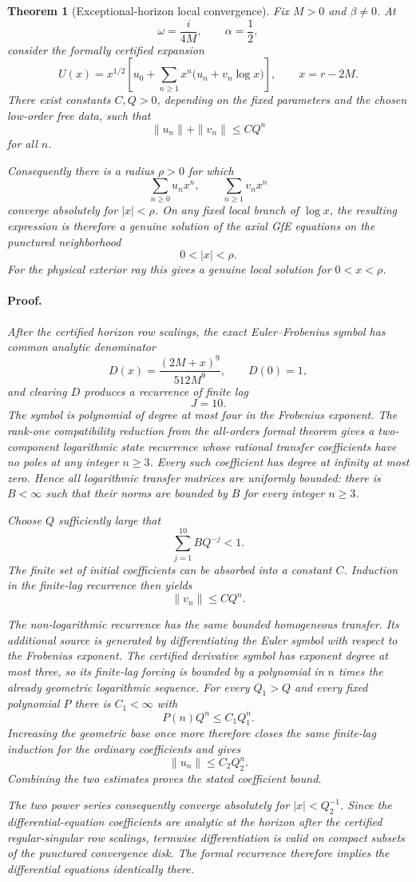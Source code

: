 \documentclass[11pt]{article}
\newtheorem{theorem}{Theorem}
\begin{document}
\begin{theorem}[Exceptional-horizon local convergence]
Fix $M>0$ and $\beta\neq0$.  At
\[
  \omega=\frac{i}{4M},
  \qquad
  \alpha=\frac12,
\]
consider the formally certified expansion
\[
  U(x)=x^{1/2}
  \left[
    u_0+\sum_{n\ge1}x^n
    \bigl(u_n+v_n\log x\bigr)
  \right],
  \qquad x=r-2M.
\]
There exist constants $C,Q>0$, depending on the fixed parameters and
the chosen low-order free data, such that
\[
  \|u_n\|+\|v_n\|\le C Q^n
\]
for all $n$.

Consequently there is a radius $\rho>0$ for which
\[
  \sum_{n\ge0}u_nx^n,
  \qquad
  \sum_{n\ge1}v_nx^n
\]
converge absolutely for $|x|<\rho$.  On any fixed local branch of
$\log x$, the resulting expression is therefore a genuine solution of
the axial GfE equations on the punctured neighborhood
\[
  0<|x|<\rho .
\]
For the physical exterior ray this gives a genuine local solution for
$0<x<\rho$.

\paragraph{Proof.}
After the certified horizon row scalings, the exact Euler--Frobenius
symbol has common analytic denominator
\[
  D(x)=\frac{(2M+x)^9}{512M^9},
  \qquad D(0)=1,
\]
and clearing $D$ produces a recurrence of finite lag
\[
  J=10.
\]
The symbol is polynomial of degree at most four in the Frobenius
exponent.  The rank-one compatibility reduction from the all-orders
formal theorem gives a two-component logarithmic state recurrence
whose rational transfer coefficients have no poles at any integer
$n\ge3$.  Every such coefficient has degree at infinity at most zero.
Hence all logarithmic transfer matrices are uniformly bounded:
there is $B<\infty$ such that their norms are bounded by $B$ for every
integer $n\ge3$.

Choose $Q$ sufficiently large that
\[
  \sum_{j=1}^{10} BQ^{-j}<1.
\]
The finite set of initial coefficients can be absorbed into a constant
$C$.  Induction in the finite-lag recurrence then yields
\[
  \|v_n\|\le C Q^n .
\]

The non-logarithmic recurrence has the same bounded homogeneous
transfer.  Its additional source is generated by differentiating the
Euler symbol with respect to the Frobenius exponent.  The certified
derivative symbol has exponent degree at most three, so its finite-lag
forcing is bounded by a polynomial in $n$ times the already geometric
logarithmic sequence.  For every $Q_1>Q$ and every fixed polynomial
$P$ there is $C_1<\infty$ with
\[
  P(n)Q^n\le C_1Q_1^n .
\]
Increasing the geometric base once more therefore closes the same
finite-lag induction for the ordinary coefficients and gives
\[
  \|u_n\|\le C_2 Q_2^n .
\]
Combining the two estimates proves the stated coefficient bound.

The two power series consequently converge absolutely for
$|x|<Q_2^{-1}$.  Since the differential-equation coefficients are
analytic at the horizon after the certified regular-singular row
scalings, termwise differentiation is valid on compact subsets of the
punctured convergence disk.  The formal recurrence therefore implies
the differential equations identically there.
\end{theorem}
\end{document}
